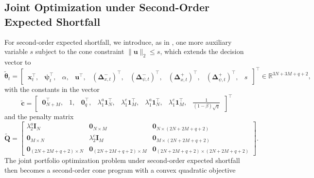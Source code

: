 \subsection{Joint Optimization under Second-Order Expected Shortfall} \label{app:joint_soes}

For second-order expected shortfall, we introduce, as in , one more auxiliary variable $s$
subject to the cone constraint $\|\bm{u}\|_2 \le s$, which extends the decision vector to
\begin{equation*}
    \tilde{\bm{\theta}}_t = \begin{bmatrix}\, \bm{x}_t^\top,& \bm{\psi}_t^\top,& \alpha,& \bm{u}^\top,&
    (\bm{\Delta}_{x,t}^-)^\top,& (\bm{\Delta}_{\psi,t}^-)^\top,&
    (\bm{\Delta}_{x,t}^+)^\top,& (\bm{\Delta}_{\psi,t}^+)^\top,& s \,\end{bmatrix}^\top
    \in \mathbb{R}^{3N+3M+q+2},
\end{equation*}
with the constants in the vector
\begin{equation*}
    \tilde{\bm{c}} = \begin{bmatrix}\, \bm{0}_{N+M}^\top,& 1,& \bm{0}_q^\top,&
    \lambda_1^a \bm{1}_N^\top,& \lambda_1^c \bm{1}_M^\top,&
    \lambda_1^a \bm{1}_N^\top,& \lambda_1^c \bm{1}_M^\top,& \tfrac{1}{(1-\beta)\sqrt{q}} \,\end{bmatrix}^\top
\end{equation*}
and the penalty matrix
\begin{equation*}
    \tilde{\bm{Q}} =
    \begin{bmatrix}
        \lambda_2^a \bm{I}_N & \bm{0}_{N \times M} & \bm{0}_{N\times(2N + 2M + q + 2)} \\
        \bm{0}_{M \times N} & \lambda_2^c \bm{I}_M & \bm{0}_{M\times(2N + 2M + q + 2)} \\
        \bm{0}_{(2N+2M+q+2) \times N} & \bm{0}_{(2N+2M+q+2) \times M} & \bm{0}_{(2N+2M+q+2) \times (2N+2M+q+2)}
    \end{bmatrix}.
\end{equation*}
The joint portfolio optimization problem under second-order expected shortfall then becomes a second-order cone
program with a convex quadratic objective
